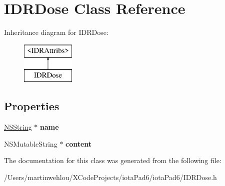 \hypertarget{interface_i_d_r_dose}{
\section{IDRDose Class Reference}
\label{interface_i_d_r_dose}
}
Inheritance diagram for IDRDose:\begin{figure}[H]
\begin{center}
\leavevmode
\includegraphics[height=2.000000cm]{interface_i_d_r_dose}
\end{center}
\end{figure}
\subsection*{Properties}
\begin{DoxyCompactItemize}
\item 
\hypertarget{interface_i_d_r_dose_a7e8e0d7ffdbf86bfd968c610cc8f261d}{
\hyperlink{class_n_s_string}{NSString} $\ast$ {\bfseries name}}
\label{interface_i_d_r_dose_a7e8e0d7ffdbf86bfd968c610cc8f261d}

\item 
\hypertarget{interface_i_d_r_dose_aee9a8f2cfa24f8a76aef33a56f9d2617}{
NSMutableString $\ast$ {\bfseries content}}
\label{interface_i_d_r_dose_aee9a8f2cfa24f8a76aef33a56f9d2617}

\end{DoxyCompactItemize}


The documentation for this class was generated from the following file:\begin{DoxyCompactItemize}
\item 
/Users/martinwehlou/XCodeProjects/iotaPad6/iotaPad6/IDRDose.h\end{DoxyCompactItemize}
